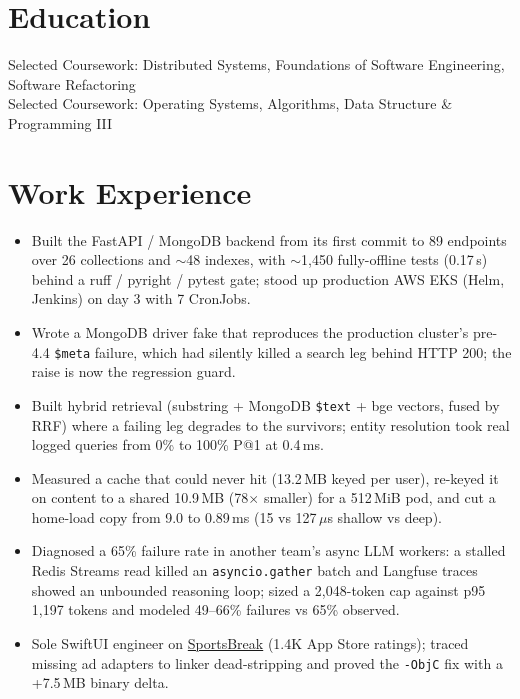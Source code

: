 \documentclass[11pt, letterpaper]{article}
\begin{document}

\section{Education}
Selected Coursework: Distributed Systems, Foundations of Software Engineering, Software Refactoring\\[1pt]
Selected Coursework: Operating Systems, Algorithms, Data Structure \& Programming III

\section{Work Experience}
\begin{itemize}
  \item Built the FastAPI / MongoDB backend from its first commit to 89 endpoints over 26 collections and $\sim$48 indexes, with $\sim$1{,}450 fully-offline tests (0.17\,s) behind a ruff / pyright / pytest gate; stood up production AWS EKS (Helm, Jenkins) on day 3 with 7 CronJobs.
  \item Wrote a MongoDB driver fake that reproduces the production cluster's pre-4.4 \texttt{\$meta} failure, which had silently killed a search leg behind HTTP 200; the raise is now the regression guard.
  \item Built hybrid retrieval (substring + MongoDB \texttt{\$text} + bge vectors, fused by RRF) where a failing leg degrades to the survivors; entity resolution took real logged queries from 0\% to 100\% P@1 at 0.4\,ms.
  \item Measured a cache that could never hit (13.2\,MB keyed per user), re-keyed it on content to a shared 10.9\,MB (78$\times$ smaller) for a 512\,MiB pod, and cut a home-load copy from 9.0 to 0.89\,ms (15 vs 127\,$\mu$s shallow vs deep).
  \item Diagnosed a 65\% failure rate in another team's async LLM workers: a stalled Redis Streams read killed an \texttt{asyncio.gather} batch and Langfuse traces showed an unbounded reasoning loop; sized a 2{,}048-token cap against p95 1{,}197 tokens and modeled 49--66\% failures vs 65\% observed.
  \item Sole SwiftUI engineer on \href{https://apps.apple.com/app/id6762649287}{SportsBreak} (1.4K App Store ratings); traced missing ad adapters to linker dead-stripping and proved the \texttt{-ObjC} fix with a +7.5\,MB binary delta.
\end{itemize}
\end{document}
